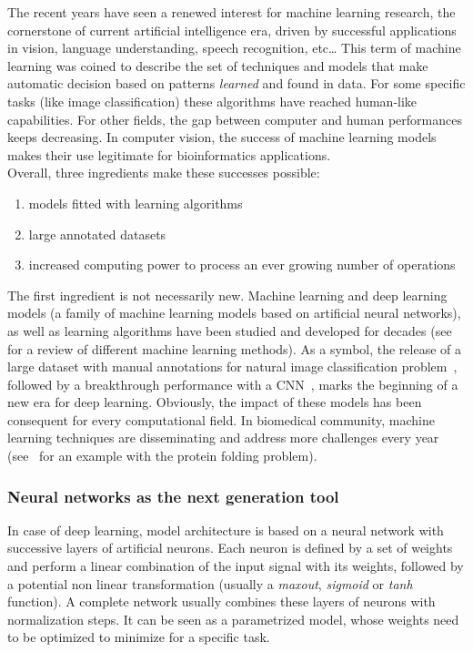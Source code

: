 The recent years have seen a renewed interest for machine learning research, the cornerstone of current artificial intelligence era, driven by successful applications in vision, language understanding, speech recognition, etc\dots
This term of machine learning was coined to describe the set of techniques and models that make automatic decision based on patterns \emph{learned} and found in data.
For some specific tasks (like image classification) these algorithms have reached human-like capabilities.
For other fields, the gap between computer and human performances keeps decreasing.
In computer vision, the success of machine learning models makes their use legitimate for bioinformatics applications.\\

\noindent
Overall, three ingredients make these successes possible:
\begin{enumerate}
	\setlength\itemsep{0.1em}
	\item models fitted with learning algorithms
	\item large annotated datasets
	\item increased computing power to process an ever growing number of operations
\end{enumerate}

\noindent
The first ingredient is not necessarily new.
Machine learning and deep learning models (a family of machine learning models based on artificial neural networks), as well as learning algorithms have been studied and developed for decades (see~\cite{Bishop_2006, Tibshirani_2009} for a review of different machine learning methods).
As a symbol, the release of a large dataset with manual annotations for natural image classification problem~\cite{Deng_2009}, followed by a breakthrough performance with a \ac{CNN}~\cite{alexnet_2012}, marks the beginning of a new era for deep learning.
Obviously, the impact of these models has been consequent for every computational field.
In biomedical community, machine learning techniques are disseminating and address more challenges every year (see~\cite{jumper_highly_2021} for an example with the protein folding problem).

\subsubsection{Neural networks as the next generation tool}

In case of deep learning, model architecture is based on a neural network with successive layers of artificial neurons.
Each neuron is defined by a set of weights and perform a linear combination of the input signal with its weights, followed by a potential non linear transformation (usually a \emph{maxout}, \emph{sigmoid} or \emph{tanh} function).
A complete network usually combines these layers of neurons with normalization steps.
It can be seen as a parametrized model, whose weights need to be optimized to minimize for a specific task.

